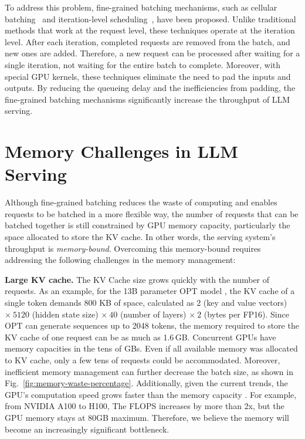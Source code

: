 To address this problem, fine-grained batching mechanisms, such as cellular batching~\cite{gao2018low} and iteration-level scheduling~\cite{yu2022orca}, have been proposed. Unlike traditional methods that work at the request level, these techniques operate at the iteration level. After each iteration, completed requests are removed from the batch, and new ones are added. Therefore, a new request can be processed after waiting for a single iteration, not waiting for the entire batch to complete. Moreover, with special GPU kernels, these techniques eliminate the need to pad the inputs and outputs. By reducing the queueing delay and the inefficiencies from padding, the fine-grained batching mechanisms significantly increase the throughput of LLM serving. 

\section{Memory Challenges in LLM Serving}

\label{sec:motivation}

Although fine-grained batching reduces the waste of computing and enables requests to be batched in a more flexible way, the number of requests that can be batched together is still constrained by GPU memory capacity, particularly the space allocated to store the KV cache. In other words, the serving system's throughput is \emph{memory-bound}.
Overcoming this memory-bound requires addressing the following challenges in the memory management:

\textbf{Large KV cache.} The KV Cache size grows quickly with the number of requests. As an example, for the 13B parameter OPT model \cite{zhang2022opt}, the KV cache of a single token demands 800 KB of space, calculated as $2$ (key and value vectors) $\times\  5120$ (hidden state size) $\times \  40$ (number of layers) $\times \  2$ (bytes per FP16). Since OPT can generate sequences up to 2048 tokens, the memory required to store the KV cache of one request can be as much as 1.6\,GB. Concurrent GPUs have memory capacities in the tens of GBs. Even if all available memory was allocated to KV cache, only a few tens of requests could be accommodated. Moreover, inefficient memory management can further decrease the batch size, as shown in Fig.~\ref{fig:memory-waste-percentage}. 
Additionally, given the current trends, the GPU's computation speed grows faster than the memory capacity \cite{gholami2021ai}. For example, from NVIDIA A100 to H100, The FLOPS increases by more than 2x, but the GPU memory stays at 80GB maximum. Therefore, we believe the memory will become an increasingly significant bottleneck.

